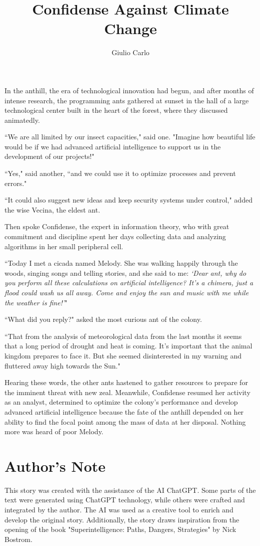 \documentclass[12pt,b5paper]{article}
\author{Giulio Carlo}
\date{}
\title{Confidense Against Climate Change}
\begin{document}
\maketitle

In the anthill, the era of technological innovation had begun, and after months
of intense research, the programming ants gathered at sunset in the hall of a
large technological center built in the heart of the forest, where they
discussed animatedly.

``We are all limited by our insect capacities," said one. "Imagine how beautiful
life would be if we had advanced artificial intelligence to support us in the
development of our projects!"

``Yes," said another, ``and we could use it to optimize processes and prevent
errors."

``It could also suggest new ideas and keep security systems under control,"
added the wise Vecina, the eldest ant.

Then spoke Confidense, the expert in information theory, who with great commitment
and discipline spent her days collecting data and analyzing algorithms in her
small peripheral cell.

``Today I met a cicada named Melody. She was walking happily through the woods,
singing songs and telling stories, and she said to me: \emph{`Dear ant, why do
you perform all these calculations on artificial intelligence? It's a chimera,
just a flood could wash us all away. Come and enjoy the sun and music
with me while the weather is fine!'}"

``What did you reply?" asked the most curious ant of the colony.

``That from the analysis of meteorological data from the last months it seems
that a long period of drought and heat is coming. It's important that the
animal kingdom prepares to face it. But she seemed disinterested in my warning
and fluttered away high towards the Sun."

Hearing these words, the other ants hastened to gather resources to prepare
for the imminent threat with new zeal. Meanwhile, Confidense resumed her activity
as an analyst, determined to optimize the colony's performance and develop
advanced artificial intelligence because the fate of the anthill depended on
her ability to find the focal point among the mass of data at her disposal.
Nothing more was heard of poor Melody.

\newpage
\section*{Author's Note}
This story was created with the assistance of the AI ChatGPT. Some parts of the
text were generated using ChatGPT technology, while others were crafted and
integrated by the author. The AI was used as a creative tool to enrich and
develop the original story.
Additionally, the story draws inspiration from the opening of the book
"Superintelligence: Paths, Dangers, Strategies" by Nick Bostrom.
\end{document}
